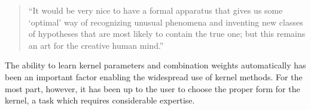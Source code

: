 \documentclass[twoside]{article}
\begin{document}
\begin{quotation}
``It would be very nice to have a formal apparatus that gives us some ‘optimal’ way of recognizing unusual phenomena and inventing new classes of hypotheses that are most likely to contain the true one; but this remains an art for the creative human mind.''

\hspace*{\fill}\citet{Jaynes85highlyinformative}


\end{quotation}


%


The ability to learn kernel parameters and combination weights automatically has been an important factor enabling the widespread use of kernel methods.
For the most part, however, it has been up to the user to choose the proper form for the kernel, a task which requires considerable expertise.
\end{document}
